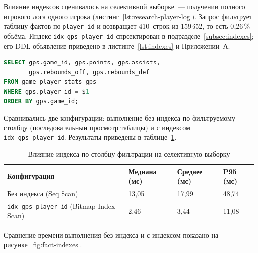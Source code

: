Влияние индексов оценивалось на селективной выборке~--- получении полного
игрового лога одного игрока (листинг~\ref{lst:research-player-log}). Запрос
фильтрует таблицу фактов по \texttt{player\_id} и возвращает 410~строк
из 159\,652, то есть 0{,}26\,\% объёма. Индекс \texttt{idx\_gps\_player\_id}
спроектирован в подразделе~\ref{subsec:indexes}; его DDL-объявление приведено
в листинге~\ref{lst:indexes} и Приложении~А.

\begin{lstlisting}[language=SQL, label=lst:research-player-log,
  caption=Селективная выборка игрового лога игрока]
SELECT gps.game_id, gps.points, gps.assists,
       gps.rebounds_off, gps.rebounds_def
FROM game_player_stats gps
WHERE gps.player_id = $1
ORDER BY gps.game_id;
\end{lstlisting}

Сравнивались две конфигурации: выполнение без индекса по фильтруемому
столбцу (последовательный просмотр таблицы) и с индексом
\texttt{idx\_gps\_player\_id}. Результаты приведены
в таблице~\ref{tab:fact-indexes}.

\begin{table}[H]
\caption{Влияние индекса по столбцу фильтрации на селективную выборку}
\label{tab:fact-indexes}
\centering
\small
\begin{tabular}{|p{}|p{}|p{}|p{}|}
\hline
\textbf{Конфигурация} & \textbf{Медиана (мс)}
  & \textbf{Среднее (мс)} & \textbf{P95 (мс)} \\
\hline
Без индекса (Seq Scan) & 13{,}05 & 17{,}99 & 48{,}74 \\
\hline
\texttt{idx\_gps\_player\_id} (Bitmap Index Scan) & 2{,}46 & 3{,}44 & 11{,}08 \\
\hline
\end{tabular}
\end{table}

Сравнение времени выполнения без индекса и с индексом показано
на рисунке~\ref{fig:fact-indexes}.

